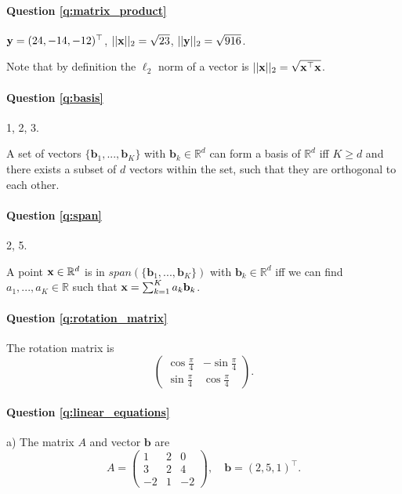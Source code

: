 \paragraph{Question \ref{q:matrix_product}}
$\mathbf{y} = (24, -14, -12)^\top$, $|| \mathbf{x} ||_2 = \sqrt{23}$, $|| \mathbf{y} ||_2 = \sqrt{916}$.

Note that by definition the $\ell_2$ norm of a vector is $|| \mathbf{x} ||_2 = \sqrt{\mathbf{x}^\top \mathbf{x}}$.

\paragraph{Question \ref{q:basis}} 1, 2, 3. 

A set of vectors $\{\mathbf{b}_1, ..., \mathbf{b}_K \}$ with $\mathbf{b}_k \in \mathbb{R}^d$ can form a basis of $\mathbb{R}^d$ iff $K \geq d$ and there exists a subset of $d$ vectors within the set, such that they are orthogonal to each other.

\paragraph{Question \ref{q:span}} 2, 5. 

A point $\mathbf{x} \in \mathbb{R}^d$ is in $span(\{\mathbf{b}_1, ..., \mathbf{b}_K \})$ with $\mathbf{b}_k \in \mathbb{R}^d$ iff we can find $a_1, ..., a_K \in \mathbb{R}$ such that $\mathbf{x} = \sum_{k=1}^K a_k \mathbf{b}_k$.

\paragraph{Question \ref{q:rotation_matrix}} The rotation matrix is 
\begin{equation*}
    \begin{pmatrix}
    \cos{\frac{\pi}{4}} & -\sin{\frac{\pi}{4}} \\
    \sin{\frac{\pi}{4}} & \cos{\frac{\pi}{4}}
    \end{pmatrix}.
\end{equation*}

\paragraph{Question \ref{q:linear_equations}}

a) The matrix $A$ and vector $\mathbf{b}$ are
\begin{equation*}
A = \begin{pmatrix}
1 & 2 & 0 \\
3 & 2 & 4 \\
-2 & 1 & -2
\end{pmatrix}, \quad \mathbf{b} = (2, 5, 1)^\top.
\end{equation*}


